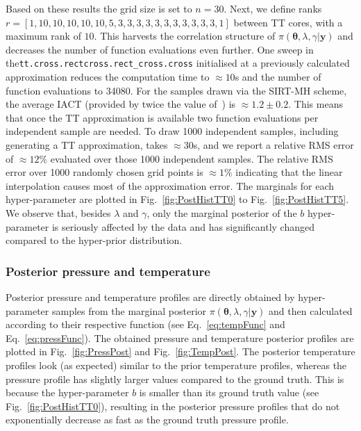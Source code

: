 Based on these results the grid size is set to $n = 30$.
Next, we define ranks $r =[ 1,  10,  10, 10, 10, 10, 5, 3, 3, 3, 3, 3, 3 , 3, 3, 3, 3, 3, 1]$ between TT cores, with a maximum rank of $10$.
This harvests the correlation structure of $\pi(\bm{\theta},\lambda,\gamma  | \bm{y})$ and decreases the number of function evaluations even further.
One sweep in the\linebreak \texttt{tt.cross.rectcross.rect\_cross.cross} initialised at a previously calculated approximation reduces the computation time to $\approx 10$s and the number of function evaluations to 34080.
For the samples drawn via the SIRT-MH scheme, the average IACT (provided by twice the value of~\cite{wolff2004monte, drikHesse}) is $\approx 1.2 \pm 0.2$.
This means that once the TT approximation is available two function evaluations per independent sample are needed.
To draw 1000 independent samples, including generating a TT approximation, takes $\approx30$s, and we report a relative RMS error of $\approx 12 \%$ evaluated over those 1000 independent samples.
The relative RMS error over 1000 randomly chosen grid points is $\approx 1\%$ indicating that the linear interpolation causes most of the approximation error.
The marginals for each hyper-parameter are plotted in Fig.~\ref{fig:PostHistTT0} to Fig.~\ref{fig:PostHistTT5}.
We observe that, besides $\lambda$ and $\gamma$, only the marginal posterior of the $b$ hyper-parameter is seriously affected by the data and has significantly changed compared to the hyper-prior distribution.
\clearpage

\subsubsection{Posterior pressure and temperature}
Posterior pressure and temperature profiles are directly obtained by hyper-parameter samples from the marginal posterior $\pi(\bm{\theta},\lambda,\gamma  | \bm{y})$ and then calculated according to their respective function (see Eq.~\ref{eq:tempFunc} and Eq.~\ref{eq:pressFunc}).
The obtained pressure and temperature posterior profiles are plotted in Fig.~\ref{fig:PressPost} and Fig.~\ref{fig:TempPost}.
The posterior temperature profiles look (as expected) similar to the prior temperature profiles, whereas the pressure profile has slightly larger values compared to the ground truth.
This is because the hyper-parameter $b$ is smaller than its ground truth value (see Fig.~\ref{fig:PostHistTT0}), resulting in the posterior pressure profiles that do not exponentially decrease as fast as the ground truth pressure profile.

